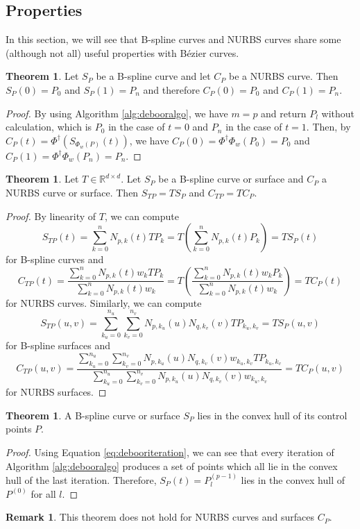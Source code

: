 \documentclass[a4paper, 11pt]{report}
\theoremstyle{definition}
\newtheorem{theorem}[definition]{Theorem}
\newtheorem*{remark}{Remark}
\begin{document}
\subsection{Properties}
	In this section, we will see that B-spline curves and NURBS curves share some (although not all) useful properties with Bézier curves.

	\begin{theorem}
		Let $S_P$ be a B-spline curve and let $C_P$ be a NURBS curve. Then $S_P(0) = P_0$ and $S_P(1) = P_n$ and therefore $C_P(0) = P_0$ and $C_P(1) = P_n$.
	\end{theorem}
	\begin{proof}
		By using Algorithm \ref{alg:debooralgo}, we have $m = p$ and return $P_l$ without calculation, which is $P_0$ in the case of $t = 0$ and $P_n$ in the case of $t = 1$. Then, by $C_P(t) = \Phi^\dagger(S_{\Phi_w(P)}(t))$, we have $C_P(0) = \Phi^\dagger\Phi_w(P_0) = P_0$ and $C_P(1) = \Phi^\dagger\Phi_w(P_n) = P_n$.
	\end{proof}

	\begin{theorem}
		Let $T \in \mathbb{R}^{d \times d}$. Let $S_P$ be a B-spline curve or surface and $C_P$ a NURBS curve or surface. Then $S_{TP} = TS_P$ and $C_{TP} = TC_P$.
	\end{theorem}
	\begin{proof}
		By linearity of $T$, we can compute
			$$S_{TP}(t) = \sum_{k=0}^{n} N_{p,k}(t) TP_k = T \left( \sum_{k=0}^{n} N_{p,k}(t) P_k \right) = TS_P(t)$$
		for B-spline curves and
			$$C_{TP}(t) = \frac{\sum_{k=0}^n N_{p,k}(t) w_k TP_k}{\sum_{k=0}^n N_{p,k}(t) w_k} = T \left( \frac{\sum_{k=0}^n N_{p,k}(t) w_k P_k}{\sum_{k=0}^n N_{p,k}(t) w_k} \right) = TC_P(t)$$
		for NURBS curves.
		Similarly, we can compute
			$$ S_{TP}(u,v) = \sum_{k_u=0}^{n_u} \sum_{k_v=0}^{n_v} N_{p,k_u}(u) N_{q,k_v}(v) TP_{k_u,k_v} = TS_P(u,v)$$
		for B-spline surfaces and
			$$ C_{TP}(u,v) = \frac {\sum_{k_u=0}^{n_u} \sum_{k_v=0}^{n_v} N_{p,k_u}(u) N_{q,k_v}(v) w_{k_u, k_v} TP_{k_u,k_v}}{\sum_{k_u=0}^{n_u} \sum_{k_v=0}^{n_v} N_{p,k_u}(u) N_{q,k_v}(v) w_{k_u, k_v}} = TC_P(u,v) $$
		for NURBS surfaces.
	\end{proof}

	\begin{theorem}
		A B-spline curve or surface $S_P$ lies in the convex hull of its control points $P$.
	\end{theorem}
	\begin{proof}
		Using Equation \ref{eq:debooriteration}, we can see that every iteration of Algorithm \ref{alg:debooralgo} produces a set of points which all lie in the convex hull of the last iteration. Therefore, $S_P(t) = P^{(p-1)}_l$ lies in the convex hull of $P^{(0)}$ for all $l$.
	\end{proof}
	\begin{remark}
		This theorem does not hold for NURBS curves and surfaces $C_P$.
	\end{remark}
\end{document}
